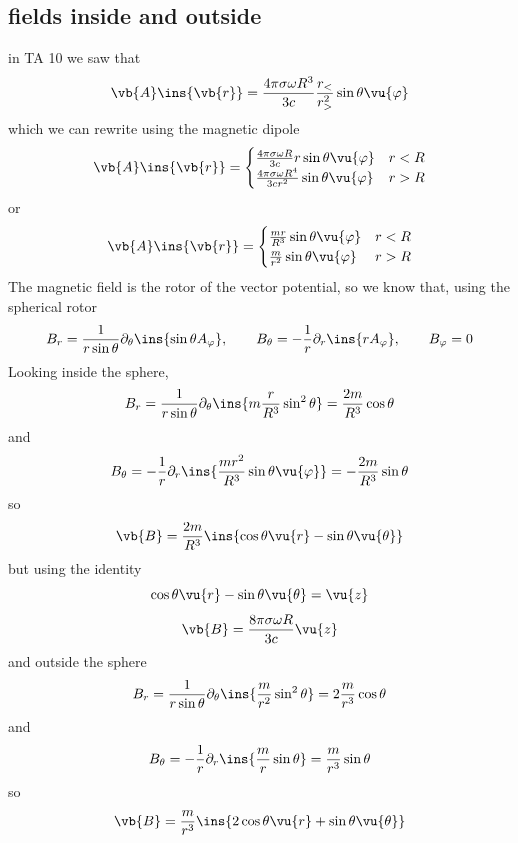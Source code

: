 \subsection{fields inside and outside}
in TA 10 we saw that 
\begin{equation}
  \vb{A}\ins{\vb{r}}=\frac{4\pi\sigma\omega R^3}{3c}\frac{r_<}{r_>^2}\sin\theta\vu{\varphi}
\end{equation}
which we can rewrite using the magnetic dipole 
\begin{equation}
  \vb{A}\ins{\vb{r}} = \begin{cases}
    \frac{4\pi\sigma\omega R}{3c}r\sin\theta\vu{\varphi} & r<R\\
    \frac{4\pi\sigma\omega R^4}{3cr^2}\sin\theta\vu{\varphi} & r>R
  \end{cases}
\end{equation}
or
\begin{equation}
  \vb{A}\ins{\vb{r}} = \begin{cases}
    \frac{mr}{R^3}\sin\theta\vu{\varphi} & r<R\\
    \frac{m}{r^2}\sin\theta\vu{\varphi} & r>R
  \end{cases}
\end{equation}
The magnetic field is the rotor of the vector potential, so we know that, using the spherical rotor
\begin{equation}
  B_r = \frac{1}{r\sin\theta}\partial_\theta\ins{\sin\theta A_\varphi},\qquad B_\theta = -\frac{1}{r}\partial_r\ins{r A_\varphi},\qquad B_\varphi=0
\end{equation}
Looking inside the sphere, 
\begin{equation}
  B_r = \frac{1}{r\sin\theta}\partial_\theta\ins{m\frac{r}{R^3}\sin^2\theta}=\frac{2m}{R^3}\cos\theta
\end{equation}
and 
\begin{equation}
  B_\theta = -\frac{1}{r}\partial_r\ins{\frac{mr^2}{R^3}\sin\theta\vu{\varphi}}=-\frac{2m}{R^3}\sin\theta
\end{equation}
so 
\begin{equation}
  \vb{B}=\frac{2m}{R^3}\ins{\cos\theta\vu{r}-\sin\theta\vu{\theta}}
\end{equation}
but using the identity
\begin{equation}
  \cos\theta\vu{r}-\sin\theta\vu{\theta}=\vu{z}
\end{equation}
\begin{equation}
  \vb{B}=\frac{8\pi\sigma\omega R}{3c}\vu{z}
\end{equation}
and outside the sphere 
\begin{equation}
  B_r = \frac{1}{r\sin\theta}\partial_\theta\ins{\frac{m}{r^2}\sin^2\theta}=2\frac{m}{r^3}\cos\theta
\end{equation}
and 
\begin{equation}
  B_\theta = -\frac{1}{r}\partial_r\ins{\frac{m}{r}\sin\theta}=\frac{m}{r^3}\sin\theta
\end{equation}
so 
\begin{equation}
  \vb{B}=\frac{m}{r^3}\ins{2\cos\theta\vu{r}+\sin\theta\vu{\theta}}
\end{equation}
